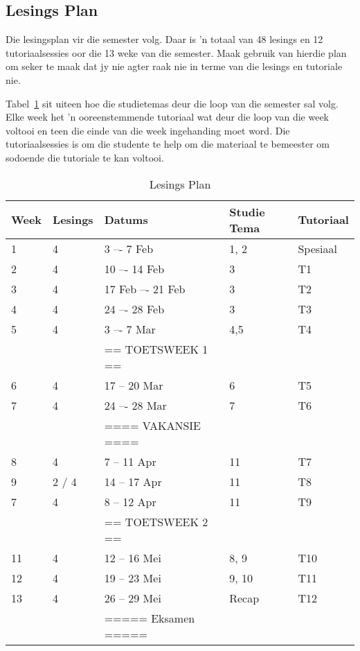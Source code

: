     \subsection{Lesings Plan}
	Die lesingsplan vir die semester volg.  Daar is 'n totaal van 48 lesings en 12 
         tutoriaalsessies oor die 13 weke van die semester. Maak gebruik van
         hierdie plan om seker te maak dat jy nie agter raak nie in terme van die lesings
	en tutoriale nie.
	
	Tabel~\ref{tab:lec_plan} sit uiteen hoe die studietemas deur die loop van die semester sal volg.
	Elke week het 'n ooreenstemmende tutoriaal wat deur die loop van die week voltooi en teen die	
	einde van die week ingehanding moet word. Die tutoriaalsessies is om die studente te help om
	die materiaal te bemeester om sodoende die tutoriale te kan voltooi.
        
        \begin{table}[!h]
            \begin{center}
             \begin{tabular}{|l|l|l|l|l|}
                 \hline
                 {\bf Week} & {\bf Lesings} & {\bf Datums} & {\bf Studie Tema} & {\bf Tutoriaal} \\
                 \hline
                 1  & 4     & 3 –- 7 Feb     & 1, 2  & Spesiaal \\
                 2  & 4     & 10 –- 14 Feb     & 3     & T1 \\
                 3  & 4     & 17 Feb –- 21 Feb  & 3  & T2 \\
                 4  & 4     & 24 –- 28 Feb       & 3     & T3 \\
                 5  & 4     & 3 –- 7 Mar       & 4,5     & T4 \\	
                    &       & == TOETSWEEK 1 == &       & \\
                 6  & 4     & 17 -- 20 Mar     & 6     & T5 \\
                 7 & 4     & 24 –- 28 Mar       & 7     & T6 \\	
                    &       & ==== VAKANSIE ==== &       & \\
                 8  & 4     & 7 -- 11 Apr      & 11  & T7 \\
                 9  & 2 / 4 & 14 -- 17 Apr       & 11     & T8 \\
                 7  & 4     & 8 -- 12 Apr      & 11  & T9 \\
                    &       & == TOETSWEEK 2 == &       & \\
                 11 & 4     & 12 -- 16 Mei     & 8, 9 & T10 \\
                 12 & 4     & 19 -- 23 Mei     & 9, 10    & T11 \\
                 13 & 4     & 26 -- 29 Mei     & Recap    & T12 \\
                    &       & ===== Eksamen ===== &       & \\
                 \hline
             \end{tabular}
             \caption{Lesings Plan} \label{tab:lec_plan}
            \end{center}
        \end{table}
        

